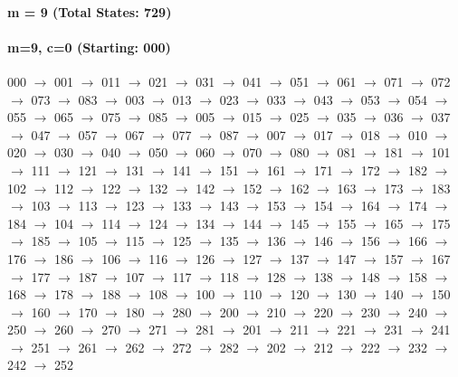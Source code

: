 \paragraph{m = 9 (Total States: 729)}



\paragraph{ m=9, c=0 (Starting: 000)}



000 $\rightarrow$ 001 $\rightarrow$ 011 $\rightarrow$ 021 $\rightarrow$ 031 $\rightarrow$ 041 $\rightarrow$ 051 $\rightarrow$ 061 $\rightarrow$ 071 $\rightarrow$ 072 $\rightarrow$ 073 $\rightarrow$ 083 $\rightarrow$ 003 $\rightarrow$ 013 $\rightarrow$ 023 $\rightarrow$ 033 $\rightarrow$ 043 $\rightarrow$ 053 $\rightarrow$ 054 $\rightarrow$ 055 $\rightarrow$ 065 $\rightarrow$ 075 $\rightarrow$ 085 $\rightarrow$ 005 $\rightarrow$ 015 $\rightarrow$ 025 $\rightarrow$ 035 $\rightarrow$ 036 $\rightarrow$ 037 $\rightarrow$ 047 $\rightarrow$ 057 $\rightarrow$ 067 $\rightarrow$ 077 $\rightarrow$ 087 $\rightarrow$ 007 $\rightarrow$ 017 $\rightarrow$ 018 $\rightarrow$ 010 $\rightarrow$ 020 $\rightarrow$ 030 $\rightarrow$ 040 $\rightarrow$ 050 $\rightarrow$ 060 $\rightarrow$ 070 $\rightarrow$ 080 $\rightarrow$ 081 $\rightarrow$ 181 $\rightarrow$ 101 $\rightarrow$ 111 $\rightarrow$ 121 $\rightarrow$ 131 $\rightarrow$ 141 $\rightarrow$ 151 $\rightarrow$ 161 $\rightarrow$ 171 $\rightarrow$ 172 $\rightarrow$ 182 $\rightarrow$ 102 $\rightarrow$ 112 $\rightarrow$ 122 $\rightarrow$ 132 $\rightarrow$ 142 $\rightarrow$ 152 $\rightarrow$ 162 $\rightarrow$ 163 $\rightarrow$ 173 $\rightarrow$ 183 $\rightarrow$ 103 $\rightarrow$ 113 $\rightarrow$ 123 $\rightarrow$ 133 $\rightarrow$ 143 $\rightarrow$ 153 $\rightarrow$ 154 $\rightarrow$ 164 $\rightarrow$ 174 $\rightarrow$ 184 $\rightarrow$ 104 $\rightarrow$ 114 $\rightarrow$ 124 $\rightarrow$ 134 $\rightarrow$ 144 $\rightarrow$ 145 $\rightarrow$ 155 $\rightarrow$ 165 $\rightarrow$ 175 $\rightarrow$ 185 $\rightarrow$ 105 $\rightarrow$ 115 $\rightarrow$ 125 $\rightarrow$ 135 $\rightarrow$ 136 $\rightarrow$ 146 $\rightarrow$ 156 $\rightarrow$ 166 $\rightarrow$ 176 $\rightarrow$ 186 $\rightarrow$ 106 $\rightarrow$ 116 $\rightarrow$ 126 $\rightarrow$ 127 $\rightarrow$ 137 $\rightarrow$ 147 $\rightarrow$ 157 $\rightarrow$ 167 $\rightarrow$ 177 $\rightarrow$ 187 $\rightarrow$ 107 $\rightarrow$ 117 $\rightarrow$ 118 $\rightarrow$ 128 $\rightarrow$ 138 $\rightarrow$ 148 $\rightarrow$ 158 $\rightarrow$ 168 $\rightarrow$ 178 $\rightarrow$ 188 $\rightarrow$ 108 $\rightarrow$ 100 $\rightarrow$ 110 $\rightarrow$ 120 $\rightarrow$ 130 $\rightarrow$ 140 $\rightarrow$ 150 $\rightarrow$ 160 $\rightarrow$ 170 $\rightarrow$ 180 $\rightarrow$ 280 $\rightarrow$ 200 $\rightarrow$ 210 $\rightarrow$ 220 $\rightarrow$ 230 $\rightarrow$ 240 $\rightarrow$ 250 $\rightarrow$ 260 $\rightarrow$ 270 $\rightarrow$ 271 $\rightarrow$ 281 $\rightarrow$ 201 $\rightarrow$ 211 $\rightarrow$ 221 $\rightarrow$ 231 $\rightarrow$ 241 $\rightarrow$ 251 $\rightarrow$ 261 $\rightarrow$ 262 $\rightarrow$ 272 $\rightarrow$ 282 $\rightarrow$ 202 $\rightarrow$ 212 $\rightarrow$ 222 $\rightarrow$ 232 $\rightarrow$ 242 $\rightarrow$ 252 